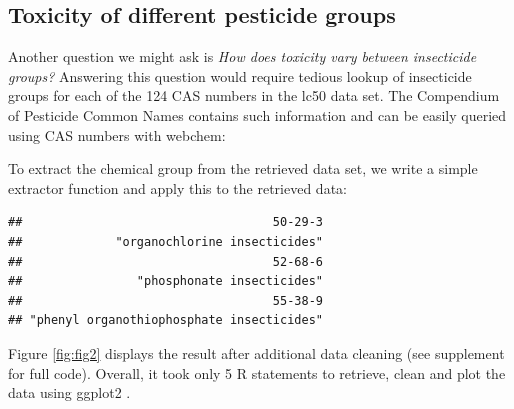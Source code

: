 \subsection[Toxicity of different pesticide groups]{Toxicity of different pesticide groups}
Another question we might ask is \emph{How does toxicity vary between insecticide groups?}
Answering this question would require tedious lookup of insecticide groups for each of the 124 CAS numbers in the lc50 data set.
The Compendium of Pesticide Common Names \citep{wood} contains such information and can be easily queried using CAS numbers with webchem: 

\begin{knitrout}
\color{fgcolor}\begin{kframe}
\begin{alltt}
 \hlkwb{<-} \hlopt{$}  \hlstd{=} \hlstd{)}
\end{alltt}
\end{kframe}
\end{knitrout}

To extract the chemical group from the retrieved data set, we write a simple extractor function and apply this to the retrieved data:

\begin{knitrout}
\color{fgcolor}\begin{kframe}
\begin{alltt}
 \hlkwb{<-}  \hlstd{(}\hlopt{$}\hlstd{subactivity[}\hlstd{])}
\hlstd{R> igroup[}\hlopt{:}\hlstd{]}
\end{alltt}
\begin{verbatim}
##                                   50-29-3 
##             "organochlorine insecticides" 
##                                   52-68-6 
##                "phosphonate insecticides" 
##                                   55-38-9 
## "phenyl organothiophosphate insecticides"
\end{verbatim}
\end{kframe}
\end{knitrout}

Figure \ref{fig:fig2} displays the result after additional data cleaning (see supplement for full code).
Overall, it took only 5 R statements to retrieve, clean and plot the data using ggplot2 \citep{ggplot2}.


